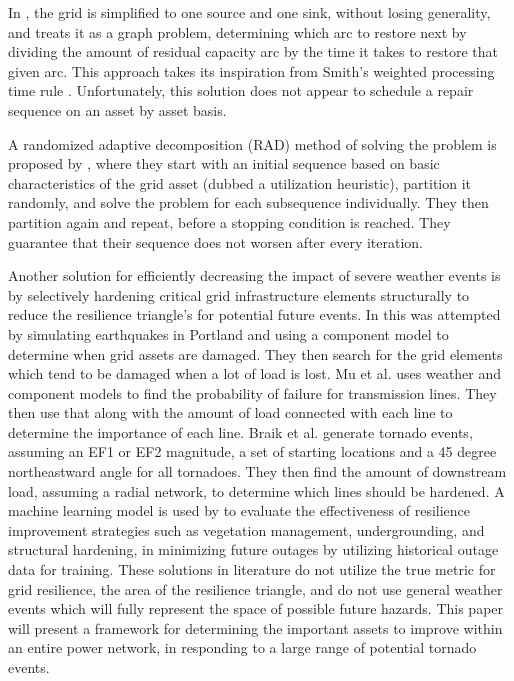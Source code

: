 \documentclass[12pt]{article}
\begin{document}
 In \cite{nurre}, the grid is simplified to one source and one sink, without losing generality, and treats it as a graph problem, determining which arc to restore next by dividing the amount of residual capacity arc by the time it takes to restore that given arc.  This approach takes its inspiration from Smith’s weighted processing time rule \cite{smith}. Unfortunately, this solution does not appear to schedule a repair sequence on an asset by asset basis. \par
A randomized adaptive decomposition (RAD) method of solving the problem is proposed by \cite{coffrin2012}, where they start with an initial sequence based on basic characteristics of the grid asset (dubbed a utilization heuristic), partition it randomly, and solve the problem for each subsequence individually. They then partition again and repeat, before a stopping condition is reached. They guarantee that their sequence does not worsen after every iteration. \par
Another solution for efficiently decreasing the impact of severe weather events is  by selectively hardening critical grid infrastructure elements structurally to reduce the resilience triangle’s for potential future events. In \cite{chalishazar} this was attempted by simulating earthquakes in Portland and using a component model to determine when grid assets are damaged. They then search for the grid elements which tend to be damaged when a lot of load is lost. Mu et al. \cite{mu} uses  weather and component models to find the probability of failure for transmission lines. They then use that along with the amount of load connected with each line to determine the importance of each line. Braik et al.  \cite{braik} generate tornado events, assuming an EF1 or EF2 magnitude, a set of starting locations and a 45  degree northeastward angle for all tornadoes. They then find the amount of downstream load, assuming a radial network, to determine which lines should be hardened. A machine learning model is used by \cite{hughes2024assessing} to evaluate the effectiveness of resilience improvement strategies such as vegetation management, undergrounding, and structural hardening, in minimizing future outages by utilizing historical outage data for training. These solutions in literature do not utilize the true metric for grid resilience, the area of the resilience triangle, and do not use general weather events which will fully represent the space of possible future hazards. This paper will present a framework for determining the important assets to improve within an entire power network, in responding to a large range of potential tornado events.
\end{document}

